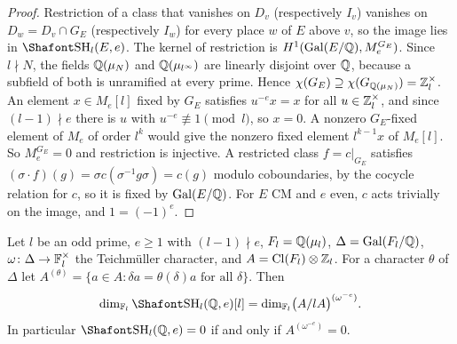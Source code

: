 \begin{proof}
Restriction of a class that vanishes on $D_v$ (respectively $I_v$) vanishes on $D_w=D_v\cap G_E$ (respectively $I_w$) for every place $w$ of $E$ above $v$, so the image lies in $\Sha_l(E,e)$. The kernel of restriction is $H^1(\operatorname{Gal}(E/\mathbb Q),M_e^{G_E})$. Since $l\nmid N$, the fields $\mathbb Q(\mu_N)$ and $\mathbb Q(\mu_{l^\infty})$ are linearly disjoint over $\mathbb Q$, because a subfield of both is unramified at every prime. Hence $\chi(G_E)\supseteq\chi(G_{\mathbb Q(\mu_N)})=\mathbb Z_l^\times$. An element $x\in M_e[l]$ fixed by $G_E$ satisfies $u^{-e}x=x$ for all $u\in\mathbb Z_l^\times$, and since $(l-1)\nmid e$ there is $u$ with $u^{-e}\not\equiv1\pmod l$, so $x=0$. A nonzero $G_E$-fixed element of $M_e$ of order $l^k$ would give the nonzero fixed element $l^{k-1}x$ of $M_e[l]$. So $M_e^{G_E}=0$ and restriction is injective. A restricted class $f=c|_{G_E}$ satisfies $(\sigma\cdot f)(g)=\sigma c(\sigma^{-1}g\sigma)=c(g)$ modulo coboundaries, by the cocycle relation for $c$, so it is fixed by $\operatorname{Gal}(E/\mathbb Q)$. For $E$ CM and $e$ even, $c$ acts trivially on the image, and $1=(-1)^e$.
\end{proof}

\begin{proposition}\label{w4:prop:classgroup}
Let $l$ be an odd prime, $e\ge1$ with $(l-1)\nmid e$, $F_l=\mathbb Q(\mu_l)$, $\Delta=\operatorname{Gal}(F_l/\mathbb Q)$, $\omega\colon\Delta\to\mathbb F_l^\times$ the Teichm\"uller character, and $A=\operatorname{Cl}(F_l)\otimes\mathbb Z_l$. For a character $\theta$ of $\Delta$ let $A^{(\theta)}=\{a\in A:\delta a=\theta(\delta)a\text{ for all }\delta\}$. Then
\[
\dim_{\F_l}\Sha_l(\Q,e)[l]=\dim_{\F_l}\bigl(A/lA\bigr)^{(\omega^{-e})}.
\]
In particular $\Sha_l(\Q,e)=0$ if and only if $A^{(\omega^{-e})}=0$.
\end{proposition}

